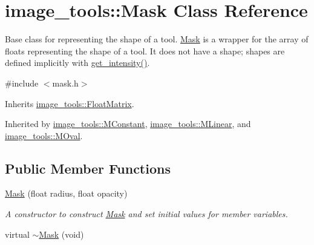 \hypertarget{classimage__tools_1_1Mask}{}\section{image\+\_\+tools\+:\+:Mask Class Reference}
\label{classimage__tools_1_1Mask}


Base class for representing the shape of a tool. \hyperlink{classimage__tools_1_1Mask}{Mask} is a wrapper for the array of floats representing the shape of a tool. It does not have a shape; shapes are defined implicitly with \hyperlink{classimage__tools_1_1Mask_a72f63a05779159c4f5e2bfea21160c8a}{get\+\_\+intensity()}.  




{\ttfamily \#include $<$mask.\+h$>$}



Inherits \hyperlink{classimage__tools_1_1FloatMatrix}{image\+\_\+tools\+::\+Float\+Matrix}.



Inherited by \hyperlink{classimage__tools_1_1MConstant}{image\+\_\+tools\+::\+M\+Constant}, \hyperlink{classimage__tools_1_1MLinear}{image\+\_\+tools\+::\+M\+Linear}, and \hyperlink{classimage__tools_1_1MOval}{image\+\_\+tools\+::\+M\+Oval}.

\subsection*{Public Member Functions}
\begin{DoxyCompactItemize}
\item 
\hyperlink{classimage__tools_1_1Mask_a5a5cfe28b70dbced61e970f189f83488}{Mask} (float radius, float opacity)\hypertarget{classimage__tools_1_1Mask_a5a5cfe28b70dbced61e970f189f83488}{}\label{classimage__tools_1_1Mask_a5a5cfe28b70dbced61e970f189f83488}

\begin{DoxyCompactList}\small\item\em A constructor to construct \hyperlink{classimage__tools_1_1Mask}{Mask} and set initial values for member variables. \end{DoxyCompactList}\item 
virtual \hyperlink{classimage__tools_1_1Mask_a7804c78fed013d5432c5443c7a09be3f}{$\sim$\+Mask} (void)
\end{DoxyCompactItemize}
